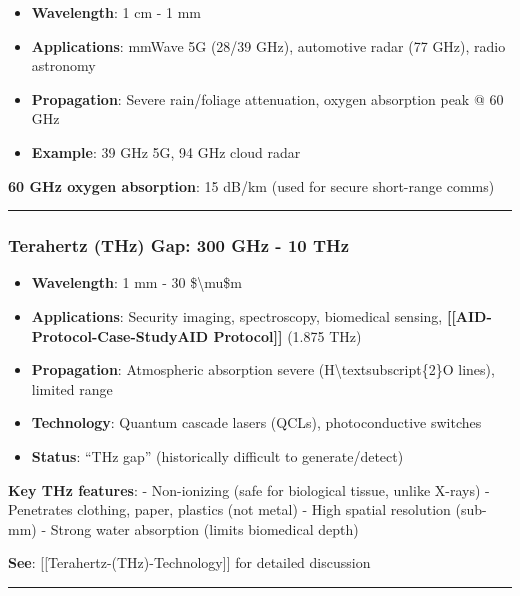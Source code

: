 \begin{itemize}
\tightlist
\item
  \textbf{Wavelength}: 1 cm - 1 mm
\item
  \textbf{Applications}: mmWave 5G (28/39 GHz), automotive radar (77
  GHz), radio astronomy
\item
  \textbf{Propagation}: Severe rain/foliage attenuation, oxygen
  absorption peak @ 60 GHz
\item
  \textbf{Example}: 39 GHz 5G, 94 GHz cloud radar
\end{itemize}

\textbf{60 GHz oxygen absorption}: 15 dB/km (used for secure short-range
comms)

\begin{center}\rule{0.5\linewidth}{0.5pt}\end{center}

\subsubsection{Terahertz (THz) Gap: 300 GHz - 10
THz}\label{terahertz-thz-gap-300-ghz---10-thz}

\begin{itemize}
\tightlist
\item
  \textbf{Wavelength}: 1 mm - 30 \$\textbackslash mu\$m
\item
  \textbf{Applications}: Security imaging, spectroscopy, biomedical
  sensing, \textbf{{[}{[}AID-Protocol-Case-Study\textbar AID
  Protocol{]}{]}} (1.875 THz)
\item
  \textbf{Propagation}: Atmospheric absorption severe
  (H\textbackslash textsubscript\{2\}O lines), limited range
\item
  \textbf{Technology}: Quantum cascade lasers (QCLs), photoconductive
  switches
\item
  \textbf{Status}: ``THz gap'' (historically difficult to
  generate/detect)
\end{itemize}

\textbf{Key THz features}: - Non-ionizing (safe for biological tissue,
unlike X-rays) - Penetrates clothing, paper, plastics (not metal) - High
spatial resolution (sub-mm) - Strong water absorption (limits biomedical
depth)

\textbf{See}: {[}{[}Terahertz-(THz)-Technology{]}{]} for detailed
discussion

\begin{center}\rule{0.5\linewidth}{0.5pt}\end{center}

